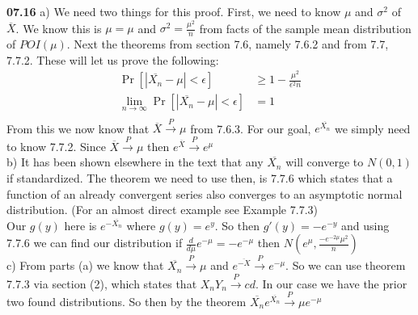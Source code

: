 {\bf 07.16} \quad a) We need two things for this proof. First, we need to know $\mu$ and $\sigma^2$ of $\overline{X}$.
We know this is $\mu = \mu$ and $\sigma^2 = \frac{\mu^2}{n}$ from facts of the sample mean distribution of $POI(\mu)$.
Next the theorems from section 7.6, namely 7.6.2 and from 7.7, 7.7.2. These will let us prove the following:\\
\begin{align*}
	\Pr \left[ | \overline{X_{n}} - \mu | < \epsilon \right] & \geq 1 - \frac{\mu^2}{\epsilon^2 n} \\
	\lim_{n \to \infty} \Pr \left[ | \overline{X_{n}} - \mu | < \epsilon \right] & = 1 \\
\end{align*}
From this we now know that $\overline{X} \overset{P}{\to} \mu$ from 7.6.3. For our goal, $e^{\overline{X_{n}}}$ we 
simply need to know 7.7.2. Since $\overline{X} \overset{P}{\to} \mu$ then $e^{\overline{X}} \overset{P}{\to} e^{\mu}$ \\

b) It has been shown elsewhere in the text that any $\overline{X_{n}}$ will converge to $N(0,1)$ if standardized. The
theorem we need to use then, is 7.7.6 which states that a function of an already convergent series also converges
to an asymptotic normal distribution. (For an almost direct example see Example 7.7.3)\\

Our $g(y)$ here is $e^{-\overline{X_{n}}}$ where $g(y) = e^y$. So then $g'(y) = -e^{-y}$ and using 7.7.6 we can find
our distribution if $\frac{d}{d\mu} e^{-\mu} = -e^{-\mu}$ then $N(e^\mu , \frac{-e^{-2\mu} \mu^2}{n})$ \\

c) From parts (a) we know that $\overline{X_{n}} \overset{P}{\to} \mu$ and $e^{\overline{-X}} \overset{P}{\to} e^{-\mu}$.
So we can use theorem 7.7.3 via section (2), which states that $X_{n} Y_{n} \overset{P}{\to} cd$. In our case we have
the prior two found distributions. So then by the theorem $\overline{X_{n}} e^{\overline{X_{n}}} \overset{P}{\to} \mu e^{-\mu}$ \\
